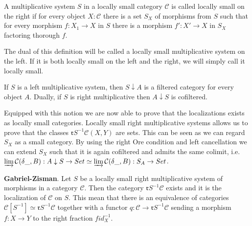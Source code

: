     \begin{definition}
         A multiplicative system $S$ in a locally small category $\mathcal{C}$ is called locally small on the right if for every object $X:\mathcal{C}$ there is a set $S_X$ of morphisms from $S$ such that for every morphism $f : X_1 \rightarrow X$ in $S$ there is a morphism $f' : X'\rightarrow X$ in $S_X$ factoring thorough $f$.

        The dual of this definition will be called a locally small multiplicative system on the left. If it is both locally small on the left and the right, we will simply call it locally small. 
    \end{definition}

    \begin{remark}
        If $S$ is a left multiplicative system, then $S\downarrow A$ is a filtered category for every object $A$. Dually, if $S$ is right multiplicative then $A\downarrow S$ is cofiltered.
    \end{remark}

    \begin{remark}
        Equipped with this notion we are now able to prove that the localizations exists as locally small categories. Locally small right multiplicative systems allows us to prove that the classes $\mathfrak{r}S^{-1}\mathcal{C}(X,Y)$ are sets. This can be seen as we can regard $S_X$ as a small category. By using the right Ore condition and left cancellation we can extend $S_X$ such that it is again cofiltered and admits the same colimit, i.e.\\
         $\varinjlim\mathcal{C}(\delta\_,B):A\downarrow S\rightarrow Set\simeq\varinjlim\mathcal{C}(\delta\_,B):S_A\rightarrow Set$. 
    \end{remark}

    \begin{theorem}
        \textbf{Gabriel-Zisman}. Let $S$ be a locally small right multiplicative system of morphisms in a category $\mathcal{C}$. Then the category $\mathfrak{r}S^{-1}\mathcal{C}$ exists and it is the localization of $\mathcal{C}$ on $S$. This mean that there is an equivalence of categories $\mathcal{C}[S^{-1}]\simeq\mathfrak{r}S^{-1}\mathcal{C}$ together with a functor $q: \mathcal{C}\rightarrow\mathfrak{r}S^{-1}\mathcal{C}$ sending a morphism $f : X\rightarrow Y$ to the right fraction $fid_X^{-1}$.
    \end{theorem}

